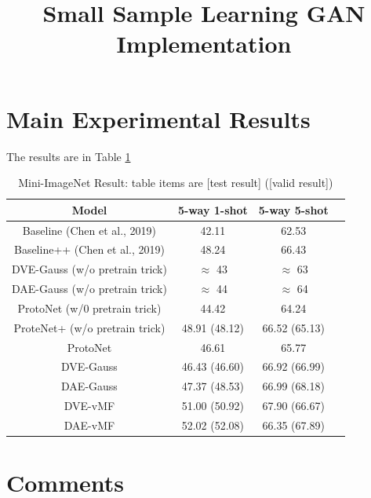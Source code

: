 \documentclass{article}
\title{Small Sample Learning GAN Implementation}
\author{}
\begin{document}
\maketitle

\section{Main Experimental Results}

The results are in Table \ref{tb:mini-imagenet}

\begin{table}[!htbp]
\centering
\caption{Mini-ImageNet Result: table items are [test result] ([valid result]) }\label{tb:mini-imagenet}
\begin{tabular}{cccc}
\toprule
Model & 5-way 1-shot & 5-way 5-shot\\
\midrule
Baseline   (Chen et al., 2019) & 42.11         & 62.53        \\
Baseline++ (Chen et al., 2019) & 48.24         & 66.43        \\
\midrule
DVE-Gauss (w/o pretrain trick) & $\approx$ 43  & $\approx$ 63 \\
DAE-Gauss (w/o pretrain trick) & $\approx$ 44  & $\approx$ 64 \\
ProtoNet  (w/0 pretrain trick) & 44.42         & 64.24         \\
ProteNet+ (w/o pretrain trick) & 48.91 (48.12) & 66.52 (65.13) \\
\midrule
ProtoNet                       & 46.61         & 65.77         \\
DVE-Gauss                      & 46.43 (46.60) & 66.92 (66.99) \\
DAE-Gauss                      & 47.37 (48.53) & 66.99 (68.18) \\
DVE-vMF                        & 51.00 (50.92) & 67.90 (66.67) \\
DAE-vMF                        & 52.02 (52.08) & 66.35 (67.89) \\
\bottomrule
\end{tabular}
\end{table}

\section{Comments}
\end{document}

